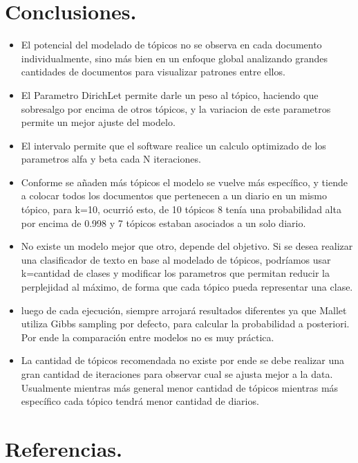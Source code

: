 \documentclass[8.5pt,twoside,twocolumn]{article}
\begin{document}
\section{Conclusiones.}
\begin{itemize}
\item El potencial del modelado de t\'opicos no se observa en cada 
documento individualmente, sino m\'as bien en un enfoque global analizando 
grandes cantidades de documentos para visualizar patrones entre ellos. 
\item El Parametro DirichLet permite darle un peso al t\'opico, haciendo 
que sobresalgo por encima de otros t\'opicos, y la variacion de este 
parametros permite un mejor ajuste del modelo.
\item El intervalo permite que el software realice un calculo optimizado de los parametros alfa y beta cada N iteraciones.
\item Conforme se a\~naden m\'as t\'opicos el modelo se vuelve m\'as espec\'ifico, y tiende a colocar todos los documentos que pertenecen a un diario en un mismo t\'opico, para k=10, ocurri\'o esto, de 10 t\'opicos 8 ten\'ia una probabilidad alta por encima de 0.998 y 7 t\'opicos estaban asociados a un solo diario.
\item No existe un modelo mejor que otro, depende del objetivo. Si se desea realizar
 una clasificador de texto en base al modelado de t\'opicos, 
podr\'iamos usar k=cantidad de clases y modificar los parametros que permitan 
reducir la perplejidad al m\'aximo, de forma que cada t\'opico pueda representar una clase.
\item luego de cada ejecuci\'on, siempre arrojar\'a resultados diferentes ya que Mallet utiliza Gibbs sampling por defecto, para calcular la probabilidad a posteriori. Por ende la comparaci\'on entre modelos no es muy pr\'actica.
\item La cantidad de t\'opicos recomendada no existe por ende se debe realizar una gran cantidad de iteraciones para observar cual se ajusta mejor a la data. Usualmente mientras m\'as general menor cantidad de t\'opicos mientras m\'as espec\'ifico cada t\'opico tendr\'a menor cantidad de diarios.
\end{itemize}

\section{Referencias.}
\end{document}
